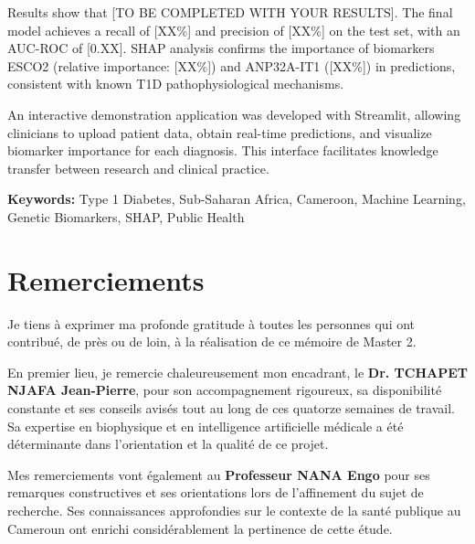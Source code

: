 \documentclass[12pt,a4paper,oneside]{report}
\begin{document}
\vspace{0.3cm}

Results show that [TO BE COMPLETED WITH YOUR RESULTS]. The final model achieves a recall of [XX\%] and precision of [XX\%] on the test set, with an AUC-ROC of [0.XX]. SHAP analysis confirms the importance of biomarkers ESCO2 (relative importance: [XX\%]) and ANP32A-IT1 ([XX\%]) in predictions, consistent with known T1D pathophysiological mechanisms.

\vspace{0.3cm}

An interactive demonstration application was developed with Streamlit, allowing clinicians to upload patient data, obtain real-time predictions, and visualize biomarker importance for each diagnosis. This interface facilitates knowledge transfer between research and clinical practice.

\vspace{0.3cm}

\textbf{Keywords:} Type 1 Diabetes, Sub-Saharan Africa, Cameroon, Machine Learning, Genetic Biomarkers, SHAP, Public Health

\clearpage

\chapter*{Remerciements}

Je tiens à exprimer ma profonde gratitude à toutes les personnes qui ont contribué, de près ou de loin, à la réalisation de ce mémoire de Master 2.

\vspace{0.3cm}

En premier lieu, je remercie chaleureusement mon encadrant, le \textbf{Dr. TCHAPET NJAFA Jean-Pierre}, pour son accompagnement rigoureux, sa disponibilité constante et ses conseils avisés tout au long de ces quatorze semaines de travail. Sa expertise en biophysique et en intelligence artificielle médicale a été déterminante dans l'orientation et la qualité de ce projet.

\vspace{0.3cm}

Mes remerciements vont également au \textbf{Professeur NANA Engo} pour ses remarques constructives et ses orientations lors de l'affinement du sujet de recherche. Ses connaissances approfondies sur le contexte de la santé publique au Cameroun ont enrichi considérablement la pertinence de cette étude.
\end{document}
